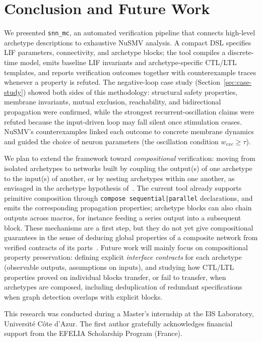 \documentclass[
]{ceurart}
\begin{document}
\section{Conclusion and Future Work}
\label{sec:conclusion}

We presented \texttt{snn\_mc}, an automated verification pipeline that
connects high-level archetype descriptions to exhaustive NuSMV analysis.
A compact DSL specifies LIF parameters, connectivity, and archetype
blocks; the tool compiles a discrete-time model, emits baseline LIF
invariants and archetype-specific CTL/LTL templates, and reports
verification outcomes together with counterexample traces whenever a
property is refuted. The negative-loop case study
(Section~\ref{sec:case-study}) showed both sides of this methodology:
structural safety properties, membrane invariants, mutual exclusion,
reachability, and bidirectional propagation were confirmed, while the
strongest recurrent-oscillation claims were refuted because the
input-driven loop may fall silent once stimulation ceases. NuSMV's
counterexamples linked each outcome to concrete membrane dynamics and
guided the choice of neuron parameters (the oscillation condition
$w_{exc} \ge \tau$).

We plan to extend the framework toward \emph{compositional} verification:
moving from isolated archetypes to networks built by coupling the
output(s) of one archetype to the input(s) of another, or by nesting
archetypes within one another, as envisaged in the archetype hypothesis
of~\cite{DeMaria2020,DeMaria2017}. The current tool already supports
primitive composition through \texttt{compose sequential|parallel}
declarations, and emits the corresponding propagation properties;
archetype blocks can also chain outputs across macros, for instance
feeding a series output into a subsequent block. These mechanisms are a
first step, but they do not yet give compositional guarantees in the
sense of deducing global properties of a composite network from verified
contracts of its parts~\cite{Clarke1999b}. Future work will mainly focus
on compositional property preservation: defining explicit \emph{interface
contracts} for each archetype (observable outputs, assumptions on
inputs), and studying how CTL/LTL properties proved on individual blocks
transfer, or fail to transfer, when archetypes are composed, including
deduplication of redundant specifications when graph detection overlaps
with explicit blocks.


\begin{acknowledgments}
This research was conducted during a Master's internship at the I3S Laboratory, Université Côte d'Azur. The first author gratefully acknowledges financial support from the EFELIA Scholarship Program (France).
\end{acknowledgments}
\end{document}
